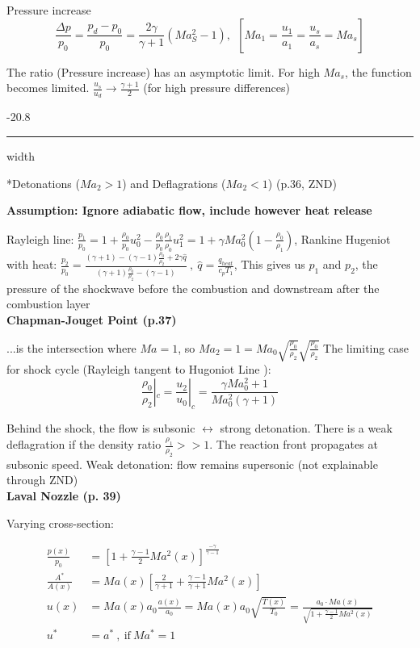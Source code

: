 \documentclass[8pt, landscape, fleqn]{scrartcl}
\makeatletter
\renewcommand{\subsubsection}{\@startsection{subsubsection}{1}{0mm}%
{-2\baselineskip}{0.8\baselineskip}%
{\hrule depth 0.2pt width\columnwidth\vspace*{1.2em}\normalsize\bfseries\rmfamily}}
\makeatother
\begin{document}
\begin{multicols*}{3}
Pressure increase
\begin{equation*}
    \frac{\Delta p}{p_0} = \frac{p_d - p_0}{p_0} = \frac{2 \gamma}{\gamma + 1} \left( Ma_S^2 -1 \right),~~[Ma_1 = \frac{u_1}{a_1} = \frac{u_s}{a_s}=Ma_s]
\end{equation*}

The ratio (Pressure increase) has an asymptotic limit. For high $Ma_s$, the function becomes limited. $\frac{u_s}{u_d} \rightarrow \frac{\gamma+1}{2}$ (for high pressure differences)

\subsubsection*{Detonations ($Ma_2 >1$) and Deflagrations ($Ma_2 < 1$) (p.36, ZND)}

\textbf{Assumption: Ignore adiabatic flow, include however heat release}

Rayleigh line: $\frac{p_1}{p_0} = 1 + \frac{\rho_0}{p_0} u_0^2 - \frac{\rho_0}{p_0}\frac{\rho_1}{\rho_0}u_1^2 = 1 + \gamma Ma_0^2 \left( 1 - \frac{\rho_0}{\rho_1}\right)$,
Rankine Hugeniot with heat: $\frac{p_2}{p_0} = \frac{(\gamma+1)-(\gamma-1)\frac{\rho_0}{\rho_2}+2\gamma \hat{q}}{(\gamma+1)\frac{\rho_0}{\rho_2}-(\gamma-1)}~,~ \hat{q} = \frac{q_{heat}}{c_p T_1}$, This gives us $p_1$ and $p_2$, the pressure of the shockwave before the combustion and downstream after the combustion layer \\

\textbf{Chapman-Jouget Point (p.37)}

...is the intersection where $Ma=1$, so $Ma_2 = 1 = Ma_0 \sqrt{\frac{\rho_0}{\rho_2}} \sqrt{\frac{\rho_0}{\rho_2}}$
The limiting case for shock cycle (Rayleigh tangent to Hugoniot Line ): 
\begin{equation*}
    \frac{\rho_0}{\rho_2} |_c = \frac{u_2}{u_0} |_c = \frac{ \gamma Ma_0^2 + 1 }{Ma_0^2 (\gamma + 1)}
\end{equation*}

Behind the shock, the flow is subsonic $\leftrightarrow$ strong detonation. There is a weak deflagration if the density ratio $\frac{\rho_1}{\rho_2} >> 1$. The reaction front propagates at subsonic speed.  Weak detonation: flow remains supersonic (not explainable through ZND)\\

\textbf{Laval Nozzle (p. 39)}

Varying cross-section:

\begin{align*}
    \frac{p(x)}{p_0} &= \left[ 1 + \frac{\gamma - 1}{2} Ma^2 (x) \right]^{\frac{-\gamma}{\gamma-1}} \\
    \frac{A^*}{A(x)} &= Ma(x) \left[ \frac{2}{\gamma+1} + \frac{\gamma-1}{\gamma+1}Ma^2(x)\right] \\
    u(x) &= Ma(x) a_0 \frac{a(x)}{a_0} = Ma(x) a_0 \sqrt{\frac{T(x)}{T_0}} = \frac{a_0 \cdot Ma(x)}{\sqrt{1 + \frac{\gamma-1}{2}Ma^2(x)}} \\
    u^* &= a^* ~,~ \text{if}~ Ma^* = 1
\end{align*}


\end{multicols*}
\end{document}
